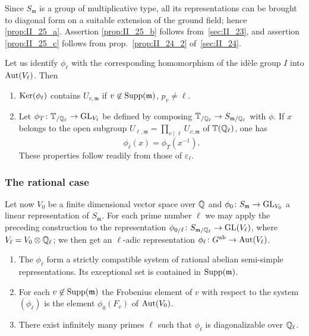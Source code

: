 Since $S_\mathfrak{m}$ is a group of multiplicative type, all its 
representations can be brought to diagonal form on a suitable extension of the 
ground field; hence \ref{prop:II_25_a}. Assertion \ref{prop:II_25_b} follows
from~\ref{sec:II_23}, and assertion \ref{prop:II_25_c} follows from
prop.~\ref{prop:II_24_2} of~\ref{sec:II_24}.

\begin{obs}
Let us identify $\phi_\ell$ with the corresponding homomorphism of the idèle 
group $I$ into $\operatorname{Aut}(V_\ell)$. Then
\begin{enumerate}[resume*=prII_25_1]
\item $\operatorname{Ker}(\phi_\ell)$ contains $U_{v , \mathfrak{m}}$ if $v \not\in 
\operatorname{Supp}(\mathfrak{m})$, $p_v \neq \ell$.
\item Let $\phi_T \colon \mathbb{T}_{/\mathbb{Q}_\ell} \to \operatorname{GL}_{V_\ell}$ be defined by 
composing $\mathbb{T}_{/\mathbb{Q}_\ell} \to S_{\mathfrak{m}/\mathbb{Q}_\ell}$ with $\phi$. If $x$ 
belongs to the open subgroup $U_{\ell , \mathfrak{m}} = \prod_{v \mid \ell} 
U_{v , \mathfrak{m}}$ of $\mathbb{T}(\mathbb{Q}_\ell)$, one has
\[
	\phi_\ell (x) = \phi_T(x^{-1}).
\]
These properties follow readily from those of $\varepsilon_\ell$.
\end{enumerate}
\end{obs}

\subsubsection{The rational case}

Let now $V_0$ be a finite dimensional vector space over $\mathbb{Q}$ and 
$\phi_0 \colon S_\mathfrak{m} \to \operatorname{GL}_{V_0}$ a linear representation of 
$S_\mathfrak{m}$. For each prime number $\ell$ we may apply the preceding 
construction to the representation $\phi_{0/\ell} \colon S_{\mathfrak{m}/
\mathbb{Q}_{\ell}} \to \operatorname{GL}(V_\ell)$, where $V_\ell = V_0 \otimes \mathbb{Q}_\ell$; 
\dpage
we then get an $\ell$-adic representation $\phi_\ell \colon G^{\mathrm{ab}} \to \operatorname{Aut}
(V_\ell)$.

\begin{thm}
\begin{enumerate}[1)]
	\item The $\phi_\ell$ form a strictly compatible system of rational abelian 
	semi-simple representations. Its exceptional set is contained in $\operatorname{Supp}
	(\mathfrak{m})$.
	\item For each $v \not\in \operatorname{Supp}(\mathfrak{m})$ the Frobenius element of $v$ 
	with respect to the system $(\phi_\ell)$ is the element $\phi_0(F_v)$ 
	of $\operatorname{Aut}(V_0)$.
	\item There exist infinitely many primes $\ell$ such that $\phi_\ell$ is 
	diagonalizable over $\mathbb{Q}_\ell$.
\end{enumerate}
\end{thm}

